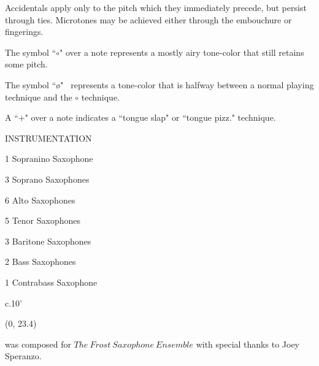 \documentclass[10pt]{article}
\begin{document}
\begin{center}
Accidentals apply only to the pitch which they immediately precede, but persist through ties. Microtones may be achieved either through the embouchure or fingerings.
\end{center}

\begin{center}
The symbol ``$\circ$" over a note represents a mostly airy tone-color that still retains some pitch.
\end{center}

\begin{center}
The symbol ``\o" \ represents a tone-color that is halfway between a normal playing technique and the $\circ$ technique.
\end{center}

\begin{center}
A ``$+$" over a note indicates a ``tongue slap" or ``tongue pizz." technique.
\end{center}

\vspace*{6\baselineskip}

\begin{center}
\huge INSTRUMENTATION
\end{center}
\begin{center}
1 Sopranino Saxophone
\end{center}
\begin{center}
3 Soprano Saxophones
\end{center}
\begin{center}
6 Alto Saxophones
\end{center}
\begin{center}
5 Tenor Saxophones
\end{center}
\begin{center}
3 Baritone Saxophones
\end{center}
\begin{center}
2 Bass Saxophones
\end{center}
\begin{center}
1 Contrabass Saxophone
\end{center}

\vspace*{7\baselineskip}

\begin{center}
c.10'
\end{center}

\begin{textblock}{23}(0, 23.4)
\begin{center}
 was composed for $The \ Frost \ Saxophone \ Ensemble$ with special thanks to Joey Speranzo.
\end{center}
\end{textblock}
\end{document}
